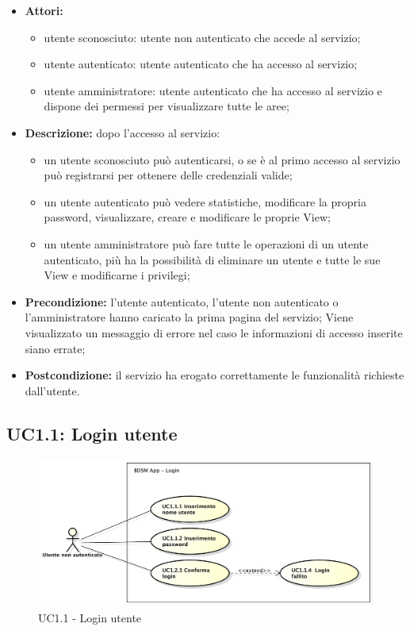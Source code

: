 \begin{itemize}

    \item \textbf{Attori:}
    \begin{itemize}
    	\item utente sconosciuto: utente non autenticato che accede al servizio;
    	\item utente autenticato: utente autenticato che ha accesso al servizio;
    	\item utente amministratore: utente autenticato che ha accesso al servizio e dispone dei permessi per visualizzare tutte le aree;
	\end{itemize}
    \item \textbf{Descrizione:}
    dopo l'accesso al servizio:
    \begin{itemize}
    	\item un utente sconosciuto può autenticarsi, o se è al primo accesso al servizio può registrarsi per ottenere delle credenziali valide;
    	\item un utente autenticato può vedere statistiche, modificare la propria password, visualizzare, creare e modificare le proprie View;
  		\item un utente amministratore può fare tutte le operazioni di un utente autenticato, più ha la possibilità di eliminare un utente e tutte le sue View e modificarne i privilegi;
	\end{itemize}
    \item \textbf{Precondizione:} l'utente autenticato, l'utente non autenticato o l'amministratore hanno caricato la prima pagina del servizio;
    Viene visualizzato un messaggio di errore nel caso le informazioni di accesso inserite siano errate;
    \item \textbf{Postcondizione:}
    il servizio ha erogato correttamente le funzionalità richieste dall'utente.

\end{itemize}

\subsection{UC1.1: Login utente}

\begin{figure}[htbp]
    \centering
    \centerline{\includegraphics[scale=0.5]{./images/UC1_1.pdf}}
    \caption{UC1.1 - Login utente}
\end{figure}


